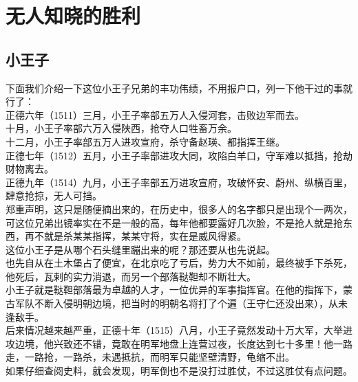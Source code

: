 \section{无人知晓的胜利}
\ifnum{}
	\begin{multicols}{\theparacolNo}
\fi
\subsection{小王子}
下面我们介绍一下这位小王子兄弟的丰功伟绩，不用报户口，列一下他干过的事就行了：\\

正德六年（1511）三月，小王子率部五万人入侵河套，击败边军而去。\\

十月，小王子率部六万入侵陕西，抢夺人口牲畜万余。\\

十二月，小王子率部五万人进攻宣府，杀守备赵瑛、都指挥王继。\\

正德七年（1512）五月，小王子率部进攻大同，攻陷白羊口，守军难以抵挡，抢劫财物离去。\\

正德九年（1514）九月，小王子率部五万进攻宣府，攻破怀安、蔚州、纵横百里，肆意抢掠，无人可挡。\\

郑重声明，这只是随便摘出来的，在历史中，很多人的名字都只是出现个一两次，可这位兄弟出镜率实在不是一般的高，每年他都要露好几次脸，不是抢人就是抢东西，再不就是杀某某指挥，某某守将，实在是威风得紧。\\

这位小王子是从哪个石头缝里蹦出来的呢？那还要从也先说起。\\

也先自从在土木堡占了便宜，在北京吃了亏后，势力大不如前，最终被手下杀死，他死后，瓦剌的实力消退，而另一个部落鞑靼却不断壮大。\\

小王子就是鞑靼部落最为卓越的人才，一位优异的军事指挥官。在他的指挥下，蒙古军队不断入侵明朝边境，把当时的明朝名将打了个遍（王守仁还没出来），从未逢敌手。\\

后来情况越来越严重，正德十年（1515）八月，小王子竟然发动十万大军，大举进攻边境，他兴致还不错，竟敢在明军地盘上连营过夜，长度达到七十多里！他一路走，一路抢，一路杀，未遇抵抗，而明军只能坚壁清野，龟缩不出。\\

如果仔细查阅史料，就会发现，明军倒也不是没打过胜仗，不过这胜仗有点问题。\\


\end{multicols}
